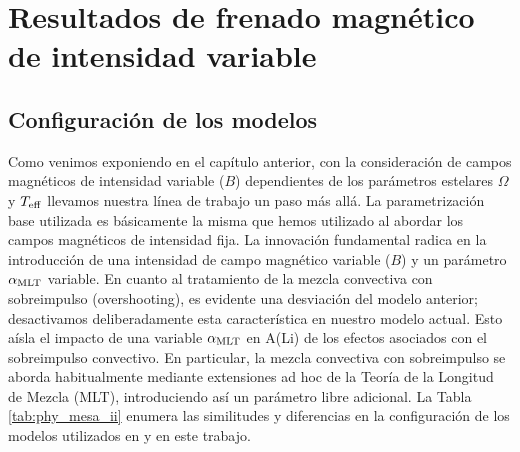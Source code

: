 

\chapter{Resultados de frenado magnético de intensidad variable}\label{ch:septimo-capitulo}
\section{Configuración de los modelos} \label{marco_teorico_ii}
Como venimos exponiendo en el capítulo anterior, con la consideración de campos magnéticos de intensidad variable ($B$) dependientes de los parámetros estelares $\Omega$ y $T_{\mathrm{eff}}$ llevamos nuestra línea de trabajo un paso más allá. La parametrización base utilizada es básicamente la misma que hemos utilizado al abordar los campos magnéticos de intensidad fija. La innovación fundamental radica en la introducción de una intensidad de campo magnético variable ($B$) y un parámetro $\alpha_{\mathrm{MLT}}$ variable. En cuanto al tratamiento de la mezcla convectiva con sobreimpulso (overshooting), es evidente una desviación del modelo anterior; desactivamos deliberadamente esta característica en nuestro modelo actual. Esto aísla el impacto de una variable $\alpha_{\mathrm{MLT}}$ en A(Li) de los efectos asociados con el sobreimpulso convectivo. En particular, la mezcla convectiva con sobreimpulso se aborda habitualmente mediante extensiones ad hoc de la Teoría de la Longitud de Mezcla (MLT), introduciendo así un parámetro libre adicional. La Tabla \ref{tab:phy_mesa_ii} enumera las similitudes y diferencias en la configuración de los modelos utilizados en \cite{Caballero2020} y en este trabajo.\par

